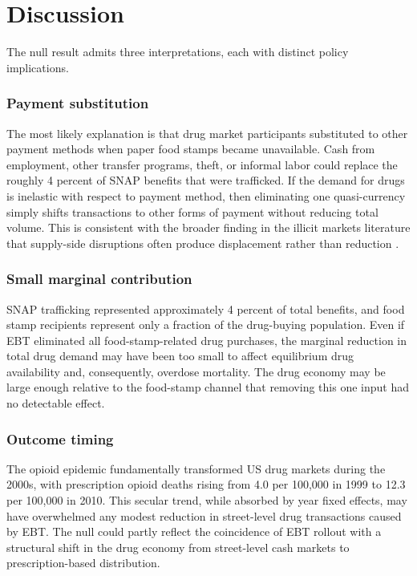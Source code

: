 \documentclass[12pt]{article}
\begin{document}
\section{Discussion}
\label{sec:discussion}

The null result admits three interpretations, each with distinct policy implications.

\subsubsection*{Payment substitution} The most likely explanation is that drug market participants substituted to other payment methods when paper food stamps became unavailable. Cash from employment, other transfer programs, theft, or informal labor could replace the roughly 4 percent of SNAP benefits that were trafficked. If the demand for drugs is inelastic with respect to payment method, then eliminating one quasi-currency simply shifts transactions to other forms of payment without reducing total volume. This is consistent with the broader finding in the illicit markets literature that supply-side disruptions often produce displacement rather than reduction \citep{reuter2006assessment}.

\subsubsection*{Small marginal contribution} SNAP trafficking represented approximately 4 percent of total benefits, and food stamp recipients represent only a fraction of the drug-buying population. Even if EBT eliminated all food-stamp-related drug purchases, the marginal reduction in total drug demand may have been too small to affect equilibrium drug availability and, consequently, overdose mortality. The drug economy may be large enough relative to the food-stamp channel that removing this one input had no detectable effect.

\subsubsection*{Outcome timing} The opioid epidemic fundamentally transformed US drug markets during the 2000s, with prescription opioid deaths rising from 4.0 per 100,000 in 1999 to 12.3 per 100,000 in 2010. This secular trend, while absorbed by year fixed effects, may have overwhelmed any modest reduction in street-level drug transactions caused by EBT. The null could partly reflect the coincidence of EBT rollout with a structural shift in the drug economy from street-level cash markets to prescription-based distribution.
\end{document}
